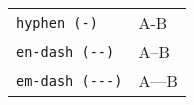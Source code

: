 \documentclass[preview]{standalone}
\begin{document}
\begin{table}[h]
    \centering
    \begin{tabular}{ll}
        \verb|hyphen (-)|    & A-B   \\
        \verb|en-dash (--)|  & A--B  \\
        \verb|em-dash (---)| & A---B
    \end{tabular}
\end{table}
\end{document}
